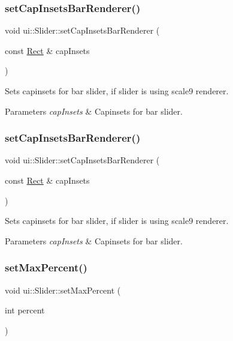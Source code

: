 \subsubsection{\texorpdfstring{set\+Cap\+Insets\+Bar\+Renderer()}{setCapInsetsBarRenderer()}\hspace{0.1cm}{\footnotesize\ttfamily [1/2]}}
{\footnotesize\ttfamily void ui\+::\+Slider\+::set\+Cap\+Insets\+Bar\+Renderer (\begin{DoxyParamCaption}\item[{const \hyperlink{classRect}{Rect} \&}]{cap\+Insets }\end{DoxyParamCaption})}

Sets capinsets for bar slider, if slider is using scale9 renderer. 
\begin{DoxyParams}{Parameters}
{\em cap\+Insets} & Capinsets for bar slider. \\
\hline
\end{DoxyParams}
\mbox{\label{classui_1_1Slider_ae0ee53b2a1e339478674a20004f3c26d}} 
\subsubsection{\texorpdfstring{set\+Cap\+Insets\+Bar\+Renderer()}{setCapInsetsBarRenderer()}\hspace{0.1cm}{\footnotesize\ttfamily [2/2]}}
{\footnotesize\ttfamily void ui\+::\+Slider\+::set\+Cap\+Insets\+Bar\+Renderer (\begin{DoxyParamCaption}\item[{const \hyperlink{classRect}{Rect} \&}]{cap\+Insets }\end{DoxyParamCaption})}

Sets capinsets for bar slider, if slider is using scale9 renderer. 
\begin{DoxyParams}{Parameters}
{\em cap\+Insets} & Capinsets for bar slider. \\
\hline
\end{DoxyParams}
\mbox{\label{classui_1_1Slider_a08507a91d537eeb3b30596512ab3ac6e}} 
\subsubsection{\texorpdfstring{set\+Max\+Percent()}{setMaxPercent()}\hspace{0.1cm}{\footnotesize\ttfamily [1/2]}}
{\footnotesize\ttfamily void ui\+::\+Slider\+::set\+Max\+Percent (\begin{DoxyParamCaption}\item[{int}]{percent }\end{DoxyParamCaption})}

